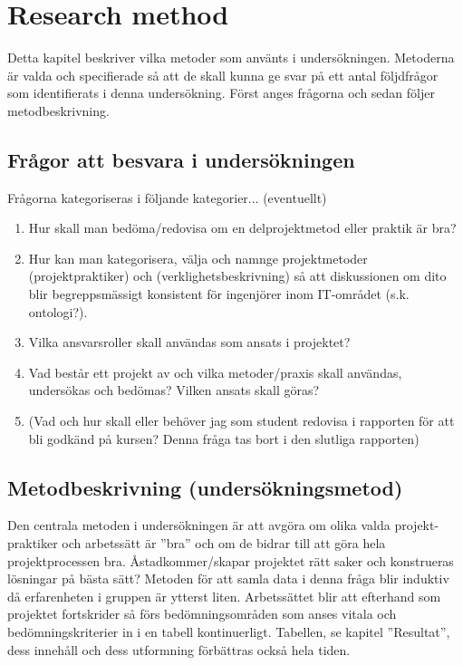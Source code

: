 
\section{Research method}
Detta kapitel beskriver vilka metoder som använts i undersökningen. Metoderna är
valda och specifierade så att de skall kunna ge svar på ett antal följdfrågor som
identifierats i denna undersökning. Först anges frågorna och sedan följer
metodbeskrivning.

\subsection{Frågor att besvara i undersökningen}
Frågorna kategoriseras i följande kategorier... (eventuellt)
\begin{enumerate}
    \item Hur skall man bedöma/redovisa om en delprojektmetod eller praktik är bra?
    \item Hur kan man kategorisera, välja och namnge projektmetoder (projektpraktiker)
    och (verklighetsbeskrivning) så att diskussionen om dito blir begreppsmässigt
    konsistent för ingenjörer inom IT-området (s.k. ontologi?).
    \item Vilka ansvarsroller skall användas som ansats i projektet?
    \item Vad består ett projekt av och vilka metoder/praxis skall användas, undersökas
    och bedömas? Vilken ansats skall göras?
    \item (Vad och hur skall eller behöver jag som student redovisa i rapporten för att
    bli godkänd på kursen? Denna fråga tas bort i den slutliga rapporten)
\end{enumerate}

\subsection{Metodbeskrivning (undersökningsmetod)}
Den centrala metoden i undersökningen är att avgöra om olika valda projekt-praktiker 
och arbetssätt är ”bra” och om de bidrar till att göra hela projektprocessen bra. 
Åstadkommer/skapar projektet rätt saker och konstrueras lösningar på bästa sätt? 
Metoden för att samla data i denna fråga blir induktiv då erfarenheten i gruppen är 
ytterst liten. Arbetssättet blir att efterhand som projektet fortskrider så förs 
bedömningsområden som anses vitala och bedömningskriterier in i en tabell kontinuerligt. 
Tabellen, se kapitel ”Resultat”, dess innehåll och dess utformning förbättras också hela 
tiden.\\

